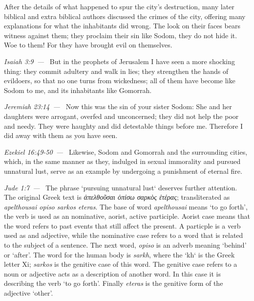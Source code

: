 \documentclass[10pt]{article}
\let\oldquote\quote
\let\endoldquote\endquote
\renewenvironment{quote}[2][]
  {\if\relax\detokenize{#1}\relax
     \def\quoteauthor{#2}%
   \else
     \def\quoteauthor{#2~---~#1}%
   \fi
   \oldquote}
  {\par\nobreak\smallskip\hfill\textit{\quoteauthor}%
   \endoldquote\addvspace{\bigskipamount}}
\begin{document}
After the details of what happened to spur the city's destruction, many later biblical and extra biblical authors discussed the crimes of the city, offering many explanations for what the inhabitants did wrong.
\begin{quote}{Isaiah 3:9}
The look on their faces bears witness against them;
    they proclaim their sin like Sodom,
    they do not hide it.
Woe to them!
    For they have brought evil on themselves.
\end{quote}
\begin{quote}{Jeremiah 23:14}
But in the prophets of Jerusalem
    I have seen a more shocking thing:
they commit adultery and walk in lies;
    they strengthen the hands of evildoers,
    so that no one turns from wickedness;
all of them have become like Sodom to me,
    and its inhabitants like Gomorrah.
\end{quote}
\begin{quote}{Ezekiel 16:49-50}
Now this was the sin of your sister Sodom: She and her daughters were arrogant, overfed and unconcerned; they did not help the poor and needy. They were haughty and did detestable things before me. Therefore I did away with them as you have seen.
\end{quote}
\begin{quote}{Jude 1:7}
Likewise, Sodom and Gomorrah and the surrounding cities, which, in the same manner as they, indulged in sexual immorality and pursued unnatural lust, serve as an example by undergoing a punishment of eternal fire.
\end{quote}
The phrase `pursuing unnatural lust` deserves further attention. The original Greek text is \textit{ἀπελθοῦσαι ὀπίσω σαρκὸς ἑτέρας}; transliterated as \textit{apelthousai opiso sarkos eteras}. The base of word \textit{apelthousai} means `to go forth', the verb is used as an nominative, aorist, active participle. Aorist case means that the word refers to past events that still affect the present. A particple is a verb used as and adjective, while the nominative case refers to a word that is related to the subject of a sentence.  The next word, \textit{opiso} is an adverb meaning `behind' or `after'. The word for the human body is \textit{sarkh}, where the `kh` is the Greek letter Xi; \textit{sarkos} is the genitive case of this word. The genitive case refers to a noun or adjective acts as a description of another word. In this case it is describing the verb `to go forth'. Finally \textit{eteras} is the genitive form of the adjective `other'. 
\end{document}
